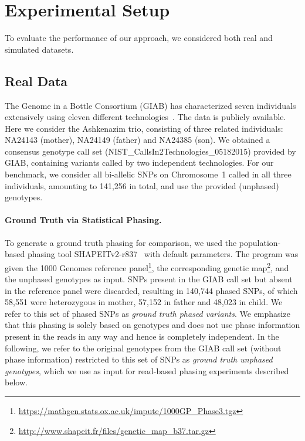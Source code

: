 \section{Experimental Setup}
To evaluate the performance of our approach, we considered both real and simulated datasets.

\subsection{Real Data}
The Genome in a Bottle Consortium (GIAB) has characterized seven individuals extensively using eleven different technologies~\citep{giab}.
The data is publicly available.
Here we consider the Ashkenazim trio, consisting of three related individuals: NA24143 (mother), NA24149 (father) and NA24385 (son).
We obtained a consensus genotype call set (NIST\_CallsIn2Technologies\_05182015) provided by GIAB, containing variants called by two independent technologies.
For our benchmark, we consider all bi-allelic SNPs on Chromosome~1 called in all three individuals, amounting to 141,256 in total, and use the provided (unphased) genotypes.

\paragraph{Ground Truth via Statistical Phasing.}
To generate a ground truth phasing for comparison, we used the population-based phasing tool SHAPEITv2-r837~\citep{shapeit} with default parameters.
The program was given the 1000 Genomes reference panel\footnote{\scriptsize{\url{https://mathgen.stats.ox.ac.uk/impute/1000GP_Phase3.tgz}}}, the corresponding genetic map\footnote{\scriptsize{\url{http://www.shapeit.fr/files/genetic_map_b37.tar.gz}}}, and the unphased genotypes as input.
SNPs present in the GIAB call set but absent in the reference panel were discarded, resulting in 140,744 phased SNPs, of which 58,551 were heterozygous in mother, 57,152 in father and 48,023 in child.
We refer to this set of phased SNPs as \emph{ground truth phased variants}.
We emphasize that this phasing is solely based on genotypes and does not use phase information present in the reads in any way and hence is completely independent.
In the following, we refer to the original genotypes from the GIAB call set (without phase information) restricted to this set of SNPs as \emph{ground truth unphased genotypes}, which we use as input for read-based phasing experiments described below.

